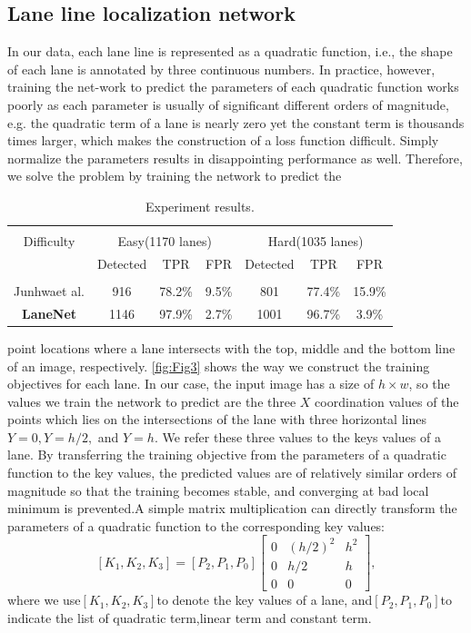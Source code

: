 \documentclass[10pt,twocolumn,letterpaper]{article}
\begin{document}
\subsection{Lane line localization network}

In our data, each lane line is represented as a quadratic function, i.e., the shape of each lane is annotated by three continuous numbers. In practice, however, training the net-work to predict the parameters of each quadratic function works poorly as each parameter is usually of significant different  orders  of  magnitude,  e.g.   the  quadratic  term  of  a lane is nearly zero yet the constant term is thousands times larger, which makes the construction of a loss function difficult. Simply normalize the parameters results in disappointing performance as well.  Therefore, we solve the problem by training the network to predict the 
\begin{table}[H]
    \centering
    \begin{tabular}{c|c|c|c|c|c|c}
        \hline \\
         Difficulty & \multicolumn{3}{c}{Easy(1170 lanes)} & \multicolumn{3}{c}{Hard(1035 lanes)} \\
         & Detected & TPR & FPR & Detected & TPR & FPR \\
         \hline\\
         Junhwaet al.\cite{} & 916 & 78.2\% & 9.5\% & 801 & 77.4\% & 15.9\% \\
         \textbf{LaneNet} & 1146 & 97.9\% & 2.7\% & 1001 & 96.7\% & 3.9\% \\
         \hline
    \end{tabular}
    \caption{Experiment results.}
    \label{tab:Tab1}
\end{table}
point locations where a lane intersects with the top, middle and the bottom line of an image, respectively.  \cref{fig:Fig3} shows the way we construct the training objectives for each lane.  In our case, the input image has a size of $h \times w$, so the values we train the network to predict are the three $X$ coordination values of the points which lies on the intersections of the lane with three horizontal lines $Y= 0,Y=h/2, $ and $ Y=h$.  We refer these three values to the keys values of a lane. By transferring the training objective from the parameters of a quadratic function to the key values, the predicted values are of relatively similar  orders  of  magnitude  so  that  the  training  becomes stable, and converging at bad local minimum is prevented.A simple matrix multiplication can directly transform the parameters of a quadratic function to the corresponding key values:
\begin{equation}
    \left[K_{1},K_{2},K_{3}\right] = \left[P_{2},P_{1},P_{0}\right]\left[\begin{array}{ccc}
         0 & (h/2)^2 & h^2  \\
         0 & h/2 & h \\
         0 & 0 & 0
    \end{array}\right] ,
\end{equation}
where we use$\left[K_{1},K_{2},K_{3}\right]$to denote the key values of a lane, and$\left[P_{2},P_{1},P_{0}\right]$to indicate the list of quadratic term,linear term and constant term.
\end{document}
